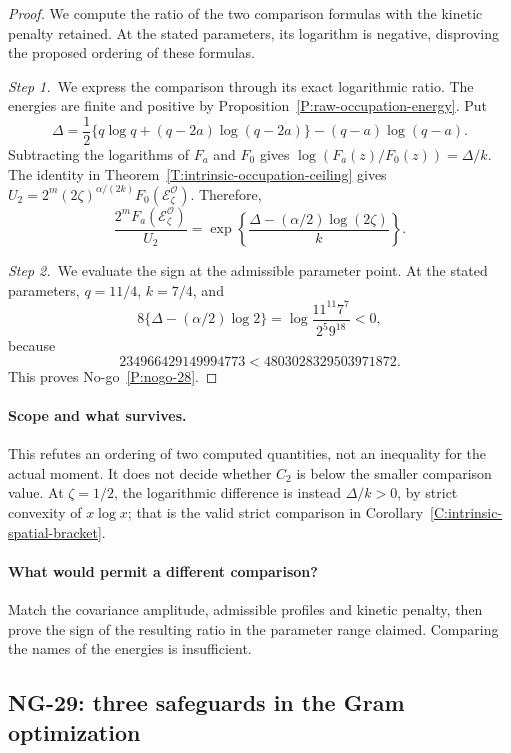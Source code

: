 \begin{proof}
  We compute the ratio of the two comparison formulas with the kinetic penalty
  retained. At the stated parameters, its logarithm is negative, disproving
  the proposed ordering of these formulas.


  \medskip
  \noindent\textit{Step 1.~}We express the comparison through its exact
  logarithmic ratio.
  The energies are finite and positive by
  Proposition~\ref{P:raw-occupation-energy}. Put
  \[
    \Delta=\frac12\{q\log q+(q-2a)\log(q-2a)\}
    -(q-a)\log(q-a).
  \]
  Subtracting the logarithms of $F_a$ and $F_0$ gives
  $\log(F_a(z)/F_0(z))=\Delta/k$. The identity in
  Theorem~\ref{T:intrinsic-occupation-ceiling} gives
  $U_2=2^m(2\zeta)^{\alpha/(2k)}F_0(\mathcal{E}_\zeta^{\mathcal O})$.
  Therefore,
  \[
    \frac{2^mF_a(\mathcal{E}_\zeta^{\mathcal O})}{U_2}
    =\exp\left\{\frac{\Delta-(\alpha/2)\log(2\zeta)}{k}\right\}.
  \]

  \medskip
  \noindent\textit{Step 2.~}We evaluate the sign at the admissible parameter
  point.
  At the stated parameters, $q=11/4$, $k=7/4$, and
  \[
    8\{\Delta-(\alpha/2)\log2\}
    =\log\frac{11^{11}7^7}{2^5 9^{18}}<0,
  \]
  because
  \[
    234966429149994773<4803028329503971872.
  \]
  This proves No-go~\ref{P:nogo-28}.
\end{proof}

\paragraph{Scope and what survives.}
This refutes an ordering of two computed quantities, not an inequality for
the actual moment. It does not decide whether $C_2$ is below the smaller
comparison value. At $\zeta=1/2$, the logarithmic difference is instead
$\Delta/k>0$, by strict convexity of $x\log x$; that is the valid strict
comparison in Corollary~\ref{C:intrinsic-spatial-bracket}.

\paragraph{What would permit a different comparison?}
Match the covariance amplitude, admissible profiles and kinetic penalty,
then prove the sign of the resulting ratio in the parameter range claimed.
Comparing the names of the energies is insufficient.

\subsection{NG-29: three safeguards in the Gram optimization}
\label{S:nogo-29}


